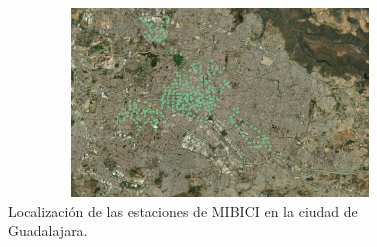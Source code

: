 \begin{figure}[H]
    \centering
    \includegraphics[width=12cm,height=5cm]{Graphics/stations.png}
    \caption{Localización de las estaciones de MIBICI en la ciudad de Guadalajara.}
    \label{fig:MIBICI_stations}
\end{figure}
